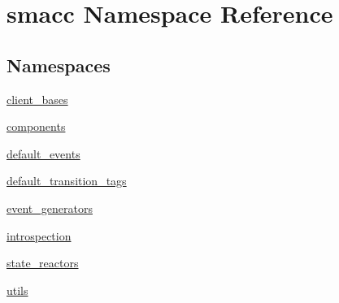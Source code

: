 \hypertarget{namespacesmacc}{}\section{smacc Namespace Reference}
\label{namespacesmacc}
\subsection*{Namespaces}
\begin{DoxyCompactItemize}
\item 
 \hyperlink{namespacesmacc_1_1client__bases}{client\+\_\+bases}
\item 
 \hyperlink{namespacesmacc_1_1components}{components}
\item 
 \hyperlink{namespacesmacc_1_1default__events}{default\+\_\+events}
\item 
 \hyperlink{namespacesmacc_1_1default__transition__tags}{default\+\_\+transition\+\_\+tags}
\item 
 \hyperlink{namespacesmacc_1_1event__generators}{event\+\_\+generators}
\item 
 \hyperlink{namespacesmacc_1_1introspection}{introspection}
\item 
 \hyperlink{namespacesmacc_1_1state__reactors}{state\+\_\+reactors}
\item 
 \hyperlink{namespacesmacc_1_1utils}{utils}
\end{DoxyCompactItemize}
